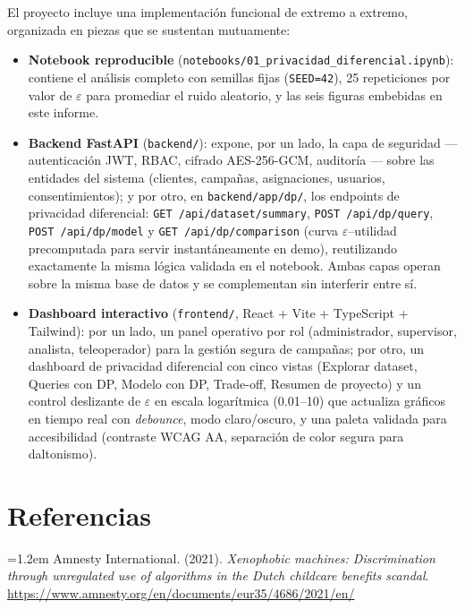 \documentclass[11pt,a4paper]{article}
\newcommand{\refitem}[1]{\par\noindent\hangindent=1.2em\hangafter=1 #1\par\smallskip}
\newcommand{\eps}{\ensuremath{\varepsilon}}
\begin{document}
El proyecto incluye una implementación funcional de extremo a extremo, organizada en piezas que se
sustentan mutuamente:

\begin{itemize}[leftmargin=1.4em]
\item \textbf{Notebook reproducible} (\texttt{notebooks/01\_privacidad\_diferencial.ipynb}):
contiene el análisis completo con semillas fijas (\texttt{SEED=42}), 25 repeticiones por valor de
\eps{} para promediar el ruido aleatorio, y las seis figuras embebidas en este informe.
\item \textbf{Backend FastAPI} (\texttt{backend/}): expone, por un lado, la capa de seguridad
--- autenticación JWT, RBAC, cifrado AES-256-GCM, auditoría --- sobre las entidades del sistema
(clientes, campañas, asignaciones, usuarios, consentimientos); y por otro, en
\texttt{backend/app/dp/}, los endpoints de privacidad diferencial:
\texttt{GET /api/dataset/summary}, \texttt{POST /api/dp/query}, \texttt{POST /api/dp/model} y
\texttt{GET /api/dp/comparison} (curva \eps--utilidad precomputada para servir instantáneamente en
demo), reutilizando exactamente la misma lógica validada en el notebook. Ambas capas operan sobre
la misma base de datos y se complementan sin interferir entre sí.
\item \textbf{Dashboard interactivo} (\texttt{frontend/}, React + Vite + TypeScript + Tailwind):
por un lado, un panel operativo por rol (administrador, supervisor, analista, teleoperador) para
la gestión segura de campañas; por otro, un dashboard de privacidad diferencial con cinco vistas
(Explorar dataset, Queries con DP, Modelo con DP, Trade-off, Resumen de proyecto) y un control
deslizante de \eps{} en escala logarítmica (0.01--10) que actualiza gráficos en tiempo real con
\emph{debounce}, modo claro/oscuro, y una paleta validada para accesibilidad (contraste WCAG AA,
separación de color segura para daltonismo).
\end{itemize}

\section{Referencias}

\refitem{Amnesty International. (2021). \emph{Xenophobic machines: Discrimination through
unregulated use of algorithms in the Dutch childcare benefits scandal}.
\url{https://www.amnesty.org/en/documents/eur35/4686/2021/en/}}
\end{document}
